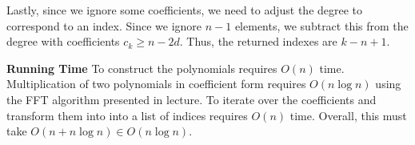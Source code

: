 \documentclass[12pt,twoside]{article}
\begin{document}
\begin{problems}
Lastly, since we ignore some coefficients, we need to adjust the degree to
correspond to an index. Since we ignore $n - 1$ elements, we subtract this from
the degree with coefficients $c_k \geq n - 2d$. Thus, the returned indexes are
$k - n + 1$.

\textbf{Running Time} To construct the polynomials requires $O(n)$ time. 
Multiplication of two polynomials in coefficient form requires $O(n \log n)$ 
using the FFT algorithm presented in lecture. To iterate over the coefficients
and transform them into into a list of indices requires $O(n)$ time. Overall,
this must take $O(n + n \log n) \in O(n \log n) $.

\end{problems}
\end{document}
